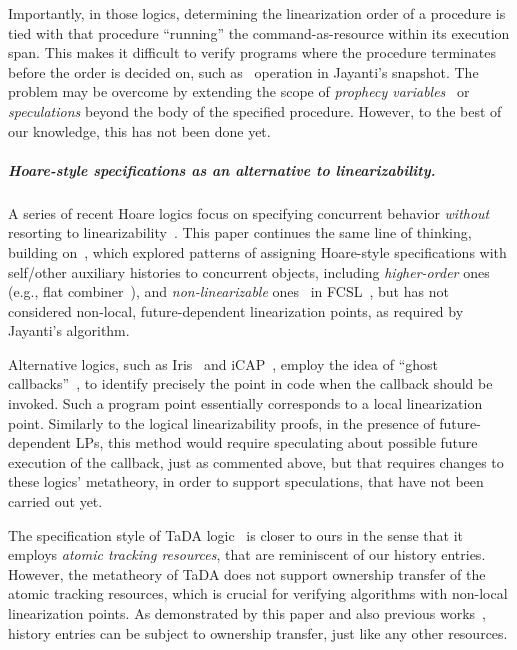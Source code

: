 \documentclass[a4paper,UKenglish]{lipics-v2016}
\theoremstyle{definition}
\begin{document}
Importantly, in those logics, determining the linearization order of a
procedure is tied with that procedure ``running'' the
command-as-resource within its execution span. This makes it difficult
to verify programs where the procedure terminates before the order is
decided on, such as \jywrite~operation in Jayanti's snapshot. The
problem may be overcome by extending the scope of \emph{prophecy
  variables}~\cite{AbadiL+lics88} or \emph{speculations} beyond the
body of the specified procedure. However, to the best of our
knowledge, this has not been done yet.

%

\subparagraph*{Hoare-style specifications as an alternative to
  linearizability.} 

A series of recent Hoare logics focus on specifying concurrent
behavior \emph{without} resorting to
linearizability~\cite{SergeyNB+ESOP15, SergeyNBD+OOPSLA16, SvendsenB+ESOP14,
  PintoDYG+ECOOP14, JungSSSTBD+POPL15}.
%
This paper continues the same line of thinking, building
on~\cite{SergeyNB+ESOP15}, which explored patterns of assigning
Hoare-style specifications with self/other auxiliary histories to
concurrent objects, including \emph{higher-order} ones (e.g., {flat
  combiner}~\cite{HendlerHIST+SPAA10}), and \emph{non-linearizable}
ones~\cite{SergeyNBD+OOPSLA16} in FCSL~\cite{NanevskiLSD+ESOP14}, but
has not considered non-local, future-dependent linearization points,
as required by Jayanti's algorithm.
%

Alternative logics, such as
Iris~\cite{JungSSSTBD+POPL15,JungKBD+ICFP16} and
iCAP~\cite{SvendsenB+ESOP14}, employ the idea of ``ghost
callbacks''~\cite{Jacobs-Piessens+POPL11}, to identify precisely the
point in code when the callback should be invoked.  Such a program
point essentially corresponds to a local linearization
point. Similarly to the logical linearizability proofs, in the
presence of future-dependent LPs, this method would require
speculating about possible future execution of the callback, just as
commented above, but that requires changes to these logics'
metatheory, in order to support speculations, that have not been
carried out yet.

The specification style of TaDA logic~\cite{PintoDYG+ECOOP14} is
closer to ours in the sense that it employs \emph{atomic tracking
  resources}, that are reminiscent of our history entries. However,
the metatheory of TaDA does not support ownership transfer of the
atomic tracking resources, which is crucial for verifying algorithms
with non-local linearization points. As demonstrated by this paper and
also previous works~\cite{SergeyNB+ESOP15,SergeyNBD+OOPSLA16}, history
entries can be subject to ownership transfer, just like any other
resources.
\end{document}
